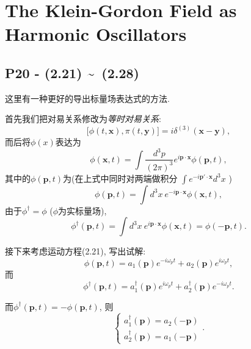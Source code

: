 \documentclass[10pt,b5paper,openany]{book}
\begin{document}
\section{The Klein-Gordon Field as Harmonic Oscillators} 

\subsection{P20 - (2.21) \textasciitilde \ (2.28)} \label{subsubsec:KG_Field_expression}

这里有一种更好的导出标量场表达式的方法. 

首先我们把对易关系修改为\textit{等时对易关系}: 
\begin{equation}
  \bigl[\phi(t, \mathbf{x}), \pi(t, \mathbf{y})\bigr] = i\delta^{(3)}(\mathbf{x} - \mathbf{y}), 
\end{equation}
而后将$\phi(x)$表达为
\begin{equation}
  \phi(\mathbf{x}, t) = \int \frac{d^3 p}{(2\pi)^3}e^{i\mathbf{p \cdot x}}\phi(\mathbf{p}, t), 
\end{equation}
其中的$\phi(\mathbf{p}, t)$为(在上式中同时对两端做积分 $\int e^{-i\mathbf{p'\cdot x}} d^3 x$ )
\begin{equation}
  \phi(\mathbf{p}, t) = \int d^3 x\ e^{-i\mathbf{p \cdot x}}\phi(\mathbf{x}, t), 
\end{equation}
由于$\phi^\dagger = \phi$ ($\phi$为实标量场), 
\begin{equation}
  \phi^{\dagger}(\mathbf{p}, t) = \int d^3 x\ e^{i\mathbf{p \cdot x}}\phi(\mathbf{x}, t) = \phi(-\mathbf{p}, t). 
\end{equation}

接下来考虑运动方程(2.21), 写出试解: 
\begin{equation}
  \phi(\mathbf{p}, t) = a_1(\mathbf{p})e^{-i\omega_p t} + a_2(\mathbf{p})e^{i\omega_p t}, 
\end{equation}
而
\begin{equation}
  \phi^{\dagger}(\mathbf{p}, t) = a_1^{\dagger}(\mathbf{p})e^{i\omega_p t} + a_2^{\dagger}(\mathbf{p})e^{-i\omega_p t}. 
\end{equation}

而$\phi^{\dagger}(\mathbf{p}, t) = -\phi(\mathbf{p}, t)$, 则
\begin{equation}
  \left\{\begin{array}{c} a_1^{\dagger}(\mathbf{p}) = a_2(\mathbf{-p})\\ a_2^{\dagger}(\mathbf{p}) = a_1(\mathbf{-p})\end{array}\right..
\end{equation}
\end{document}
